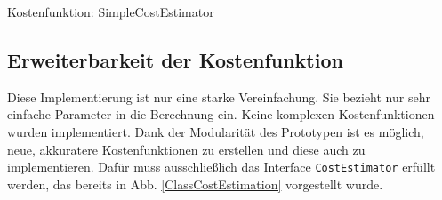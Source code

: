 \begin{algorithm}[ht]
\SetAlgoLined
{}

\label{PseudocodeCostEstimator}
\caption{Kostenfunktion: SimpleCostEstimator}
\end{algorithm}


\subsection{Erweiterbarkeit der Kostenfunktion}
Diese Implementierung ist nur eine starke Vereinfachung. Sie bezieht nur sehr einfache Parameter in die Berechnung ein. Keine komplexen Kostenfunktionen wurden implementiert. Dank der Modularität des Prototypen ist es möglich, neue, akkuratere Kostenfunktionen zu erstellen und diese auch zu implementieren. Dafür muss ausschließlich das Interface \texttt{Cost\-Estimator} erfüllt werden, das bereits in Abb. \ref{ClassCostEstimation} vorgestellt wurde.
